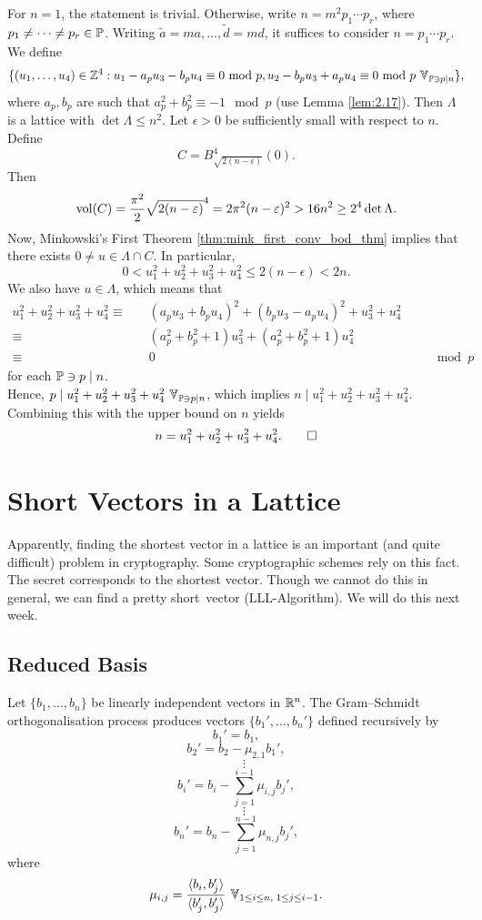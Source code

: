 \documentclass{Vorlesungstemplate_English} %
\begin{document}
\begin{pf}
  For $n=1$, the statement is trivial. Otherwise, write $n = m^2p_1\cdots p_r$, where $p_1 \neq \cdots \neq p_r \in \mathbb{P}$. Writing $\widetilde{a} = ma, \dots, \widetilde{d} = md$, it suffices to consider $n=p_1\cdots p_r$. We define
  \[ \{ (u_1, \dots, u_4) \in \Z^4: u_1-a_pu_3-b_pu_4 \equiv 0 \smod p, u_2-b_pu_3+a_pu_4 \equiv 0 \smod p \forall_{\PP \ni p \mid n}\},\]
  where $a_p, b_p$ are such that $a_p^2+b_p^2 \equiv -1 \mod p$ (use Lemma \ref{lem:2.17}). Then $\Lambda$ is a lattice with $\det\Lambda \leq n^2$. Let $\epsilon > 0$ be sufficiently small with respect to $n$. Define
  \[ C = B^4_{\sqrt{2(n-\epsilon)}}(0).\]
  Then
  \[ \text{vol}(C) = \frac{\pi^2}{2}\sqrt{2(n-\varepsilon)}^4 =2\pi^2(n-\varepsilon)^2 >  16n^2 \geq 2^4\det\Lambda.\]
  Now, Minkowski's First Theorem \ref{thm:mink_first_conv_bod_thm} implies that there exists $0 \neq u \in \Lambda \cap C$. In particular,
  \[ 0 < u_1^2+u_2^2+u_3^2+u_4^2 \leq 2(n-\epsilon) <2n.\]
  We also have $u \in \Lambda$, which means that
  \begin{align*} u_1^2+u_2^2+u_3^2+u_4^2 \equiv \quad &  (a_pu_3+b_pu_4)^2+(b_pu_3-a_pu_4)^2+u_3^2+u_4^2 \\
  \equiv \quad & (a_p^2+b_p^2+1)u_3^2 + (a_p^2+b_p^2+1)u_4^2 \\
  \equiv \quad & 0 \hspace{9cm} \mod p\end{align*}
  for each $\mathbb{P} \ni p \mid n$. \\
  Hence, $p \mid u_1^2+u_2^2+u_3^2+u_4^2 \forall_{\PP \ni p \mid n}$, which implies $n \mid u_1^2+u_2^2+u_3^2+u_4^2$. Combining this with the upper bound on $n$ yields
  \[ n = u_1^2+u_2^2+u_3^2+u_4^2. \qedhere\]
\end{pf}
\section{Short Vectors in a Lattice}
Apparently, finding the shortest vector in a lattice is an important (and quite difficult) problem in cryptography. Some cryptographic schemes rely on this fact. The secret corresponds to the shortest vector. Though we cannot do this in general, we can find a \glqq pretty short\grqq \ vector (LLL-Algorithm). We will do this next week.
\subsection{Reduced Basis}
Let $\{ b_1, \dots, b_n \}$ be linearly independent vectors in $\mathbb{R}^n$.
The Gram--Schmidt orthogonalisation process produces vectors
$\{ b_1', \dots, b_n' \}$ defined recursively by
\[
b_1' = b_1,
\]
\[
b_2' = b_2 - \mu_{2,1}b_1',
\]
\[
\quad \  \vdots
\]
\[
b_i'
=
b_i
-
\sum_{j=1}^{i-1}\mu_{i,j}b_j',
\]
\[
\quad \ \vdots
\]
\[
b_n'
=
b_n
-
\sum_{j=1}^{n-1}\mu_{n,j}b_j',
\]
where
\[
\mu_{i,j}
=
\frac{\inp{b_i}{b_j'}}
     {\inp{b_j'}{b_j'}}
\forall_{1 \leq i \leq n,\; 1 \leq j \leq i-1}.
\]
\end{document}
